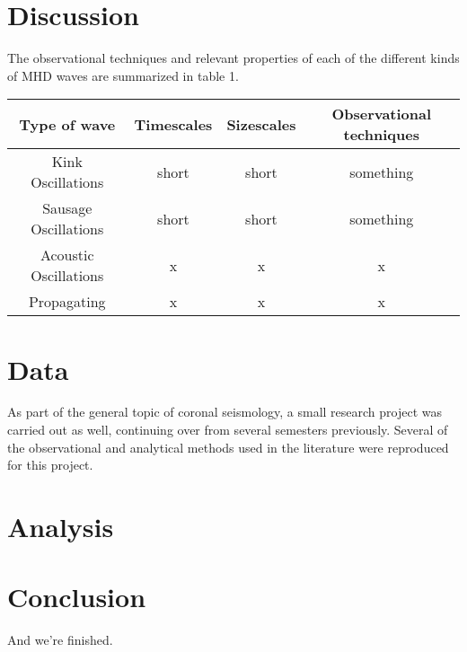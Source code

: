 \documentclass[preprint2]{aastex}
\begin{document}
\section{Discussion}\label{disc}
The observational techniques and relevant properties of each of the different
kinds of MHD waves are summarized in table 1.
\begin{table*}[ht]
    \centering
    \begin{tabular}{c c c c}
        \hline\hline
        Type of wave &
        Timescales &
        Sizescales &
        Observational techniques\\
        \hline
        Kink Oscillations & short & short & something\\
        Sausage Oscillations & short & short & something\\
        Acoustic Oscillations & x & x & x\\
        Propagating & x & x & x\\
        \hline\hline
    \end{tabular}
\end{table*}

\section{Data}\label{data}
As part of the general topic of coronal seismology,
a small research project was carried out as well, continuing
over from several semesters previously. Several of the observational
and analytical methods used in the literature were reproduced for
this project.

\section{Analysis}\label{analysis}

\section{Conclusion}\label{conclusion}
And we're finished.


\end{document}
